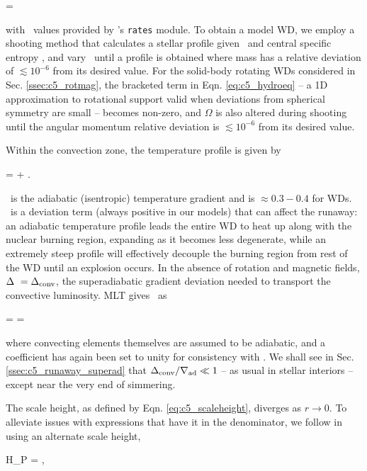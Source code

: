 \eqbegin
{} = \epscc
\label{eq:c5_dldm}
\eqend

\noindent with \epscc\ values provided by \mesa's \texttt{rates} module.  To obtain a model WD, we employ a shooting method that calculates a stellar profile given \rhoc\ and central specific entropy \Sc, and vary \rhoc\ until a profile is obtained where mass has a relative deviation of $\lesssim 10^{-6}$ from its desired value.  For the solid-body rotating WDs considered in Sec. \ref{ssec:c5_rotmag}, the bracketed term in Eqn. \ref{eq:c5_hydroeq} -- a 1D approximation to rotational support valid when deviations from spherical symmetry are small -- becomes non-zero, and $\Omega$ is also altered during shooting until the angular momentum relative deviation is $\lesssim 10^{-6}$ from its desired value.

Within the convection zone, the temperature profile is given by

\eqbegin
\nabla \equiv {} = \nablaad + \deltanab.
\label{eq:c5_tempgrad}
\eqend

\noindent \nablaad\ is the adiabatic (isentropic) temperature gradient and is $\approx 0.3 -  0.4$ for WDs.  \deltanab\ is a deviation term (always positive in our models) that can affect the runaway: an adiabatic temperature profile leads the entire WD to heat up along with the nuclear burning region, expanding as it becomes less degenerate, while an extremely steep profile will effectively decouple the burning region from rest of the WD until an explosion occurs.  In the absence of rotation and magnetic fields, $\deltanab\ = \dnabconv$, the superadiabatic gradient deviation needed to transport the convective luminosity.  MLT gives \dnabconv\ as

\eqbegin
\dnabconv =  = 
\label{eq:c5_superad_dev}
\eqend

\noindent where convecting elements themselves are assumed to be adiabatic, and a coefficient has again been set to unity for consistency with \citeal{piroc08}.  We shall see in Sec. \ref{ssec:c5_runaway_superad} that $\dnabconv/\nablaad \ll 1$ -- as usual in stellar interiors -- except near the very end of simmering.

The scale height, as defined by Eqn. \ref{eq:c5_scaleheight}, diverges as $r\rightarrow0$.  To alleviate issues with expressions that have it in the denominator, we follow \cite{paxt+11} in using an alternate scale height,

\eqbegin
H_P = ,
\eqend

